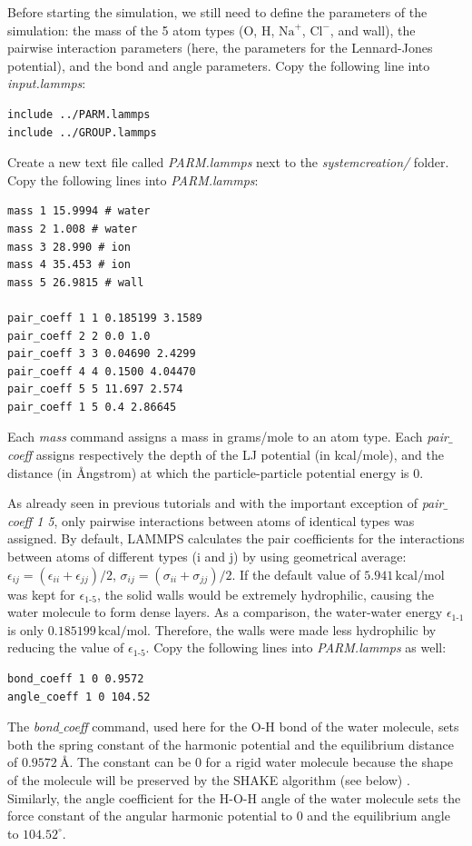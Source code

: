 \documentclass[9pt,tutorial]{livecoms}
\begin{document}
Before starting the simulation, we still need to define the parameters of the simulation: the mass of the 5 atom types (O, H, $\text{Na}^+$, $\text{Cl}^-$, and wall), the pairwise interaction parameters (here, the parameters for the Lennard-Jones potential), and the bond and angle parameters. Copy the following line into \textit{input.lammps}:
{\normalsize \begin{verbatim}
include ../PARM.lammps
include ../GROUP.lammps
\end{verbatim}}
Create a new text file called \textit{PARM.lammps} next to the \textit{systemcreation/} folder. Copy the following lines into \textit{PARM.lammps}:
{\normalsize \begin{verbatim}
mass 1 15.9994 # water
mass 2 1.008 # water
mass 3 28.990 # ion
mass 4 35.453 # ion
mass 5 26.9815 # wall

pair_coeff 1 1 0.185199 3.1589 
pair_coeff 2 2 0.0 1.0
pair_coeff 3 3 0.04690 2.4299
pair_coeff 4 4 0.1500 4.04470
pair_coeff 5 5 11.697 2.574
pair_coeff 1 5 0.4 2.86645
\end{verbatim}}
Each \textit{mass} command assigns a mass in grams/mole to an atom type. Each \textit{pair$\_$coeff} assigns respectively the depth of the LJ potential (in kcal/mole), and the distance (in Ångstrom) at which the particle-particle potential energy is 0.

As already seen in previous tutorials and with the important exception of \textit{pair$\_$coeff 1 5}, only pairwise interactions between atoms of identical types was assigned. By default, LAMMPS calculates the pair coefficients for the interactions between atoms of different types (i and j) by using geometrical average: $\epsilon_{ij} = (\epsilon_{ii} + \epsilon_{jj})/2$,  $\sigma_{ij} = (\sigma_{ii} + \sigma_{jj})/2$. If the default value of $5.941\,\text{kcal/mol}$ was kept for $\epsilon_\text{1-5}$, the solid walls would be extremely hydrophilic, causing the water molecule to form dense layers. As a comparison, the water-water energy $\epsilon_\text{1-1}$ is only $0.185199\,\text{kcal/mol}$. Therefore, the walls were made less hydrophilic by reducing the value of $\epsilon_\text{1-5}$. Copy the following lines into \textit{PARM.lammps} as well:
{\normalsize \begin{verbatim}   
bond_coeff 1 0 0.9572
angle_coeff 1 0 104.52
\end{verbatim}}
The \textit{bond$\_$coeff} command, used here for the O-H bond of the water molecule, sets both the spring constant of the harmonic potential and the equilibrium distance of $0.9572~\text{\AA{}}$. The constant can be 0 for a rigid water molecule because the shape of the molecule will be preserved by the SHAKE algorithm (see below) \cite{ryckaert1977numerical, andersen1983rattle}. Similarly, the angle coefficient for the H-O-H angle of the water molecule sets the force constant of the angular harmonic potential to 0 and the equilibrium angle to $104.52^\circ$.
\end{document}

